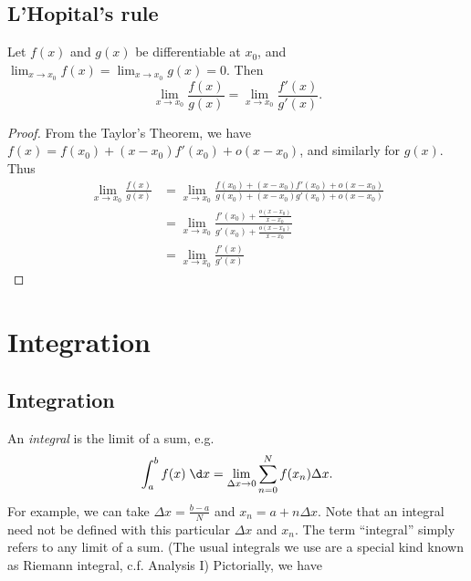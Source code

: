 \documentclass[a4paper]{article}
\begin{document}
\subsection{L'Hopital's rule}
\begin{thm}
  Let $f(x)$ and $g(x)$ be differentiable at $x_0$, and $\displaystyle \lim_{x\to x_0}f(x) = \lim_{x\to x_0}g(x) = 0$. Then
  \[
  \lim_{x\to x_0} \frac{f(x)}{g(x)} = \lim_{x\to x_0} \frac{f'(x)}{g'(x)}.
  \]
\end{thm}
\begin{proof}
  From the Taylor's Theorem, we have $f(x) = f(x_0) + (x - x_0)f'(x_0) + o(x - x_0)$, and similarly for $g(x)$. Thus
  \begin{align*}
    \lim_{x\to x_0} \frac{f(x)}{g(x)} &= \lim_{x\to x_0} \frac{f(x_0) + (x - x_0)f'(x_0) + o(x - x_0)}{g(x_0) + (x - x_0)g'(x_0) + o(x - x_0)}\\
    &= \lim_{x\to x_0} \frac{f'(x_0) + \frac{o(x-x_0)}{x-x_0}}{g'(x_0) + \frac{o(x-x_0)}{x-x_0}}\\
    &= \lim_{x\to x_0} \frac{f'(x)}{g'(x)}
  \end{align*}
\end{proof}

\section{Integration}
\subsection{Integration}
\begin{defi}[Integral]
  An \emph{integral} is the limit of a sum, e.g. 
  \[
  \int_a^b f(x) \;\d x = \lim_{\Delta x\to 0}\sum_{n=0}^N f(x_n)\Delta x.
  \]
  For example, we can take $\Delta x=\frac{b - a}{N}$ and $x_n = a + n\Delta x$. Note that an integral need not be defined with this particular $\Delta x$ and $x_n$. The term ``integral'' simply refers to any limit of a sum. (The usual integrals we use are a special kind known as Riemann integral, c.f. Analysis I) Pictorially, we have
  \begin{center}
  \end{center}
\end{defi}
\end{document}
